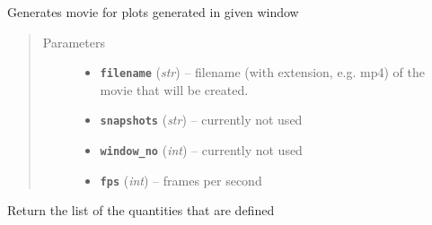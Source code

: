 \documentclass[letterpaper,10pt,english]{sphinxmanual}
\begin{document}
\begin{fulllineitems}
\label{index:facade.make_movie}
Generates movie for plots generated in given window
\begin{quote}\begin{description}
\item[{Parameters}] \leavevmode\begin{itemize}
\item {} 
\textbf{\texttt{filename}} (\emph{str}) -- filename (with extension, e.g. mp4) of the movie that will
be created.

\item {} 
\textbf{\texttt{snapshots}} (\emph{str}) -- currently not used

\item {} 
\textbf{\texttt{window\_no}} (\emph{int}) -- currently not used

\item {} 
\textbf{\texttt{fps}} (\emph{int}) -- frames per second

\end{itemize}

\end{description}\end{quote}

\end{fulllineitems}


\begin{fulllineitems}
\label{index:facade.KnownQuantities}
Return the list of the quantities that are defined

\end{fulllineitems}

\end{document}
